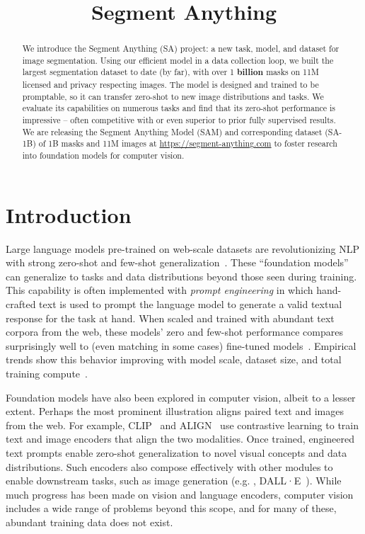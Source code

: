 \title{Segment Anything}

\begin{abstract}
We introduce the Segment Anything (SA) project: a new task, model, and dataset for image segmentation. Using our efficient model in a data collection loop, we built the largest segmentation dataset to date (by far), with over 1 \textbf{billion} masks on 11M licensed and privacy respecting images. The model is designed and trained to be promptable, so it can transfer zero-shot to new image distributions and tasks. We evaluate its capabilities on numerous tasks and find that its zero-shot performance is impressive -- often competitive with or even superior to prior fully supervised results. We are releasing the Segment Anything Model (SAM) and corresponding dataset (\mbox{SA-1B}) of 1B masks and 11M images at \href{https://segment-anything.com}{https://segment-anything.com} to foster research into foundation models for computer vision.
\end{abstract}

\section{Introduction}\label{sec:intro}

Large language models pre-trained on web-scale datasets are revolutionizing NLP with strong zero-shot and few-shot generalization~\cite{Brown2020}. These ``foundation models''~\cite{bommasani2021opportunities} can generalize to tasks and data distributions beyond those seen during training. This capability is often implemented with \emph{prompt engineering} in which hand-crafted text is used to prompt the language model to generate a valid textual response for the task at hand. When scaled and trained with abundant text corpora from the web, these models' zero and few-shot performance compares surprisingly well to (even matching in some cases) fine-tuned models~\cite{Brown2020,chowdhery2022palm}. Empirical trends show this behavior improving with model scale, dataset size, and total training compute~\cite{kaplan2020scaling,Brown2020,chowdhery2022palm,hoffmann2022training}.

Foundation models have also been explored in computer vision, albeit to a lesser extent. Perhaps the most prominent illustration aligns paired text and images from the web. For example, CLIP~\cite{Radford2021} and ALIGN~\cite{jia2021scaling} use contrastive learning to train text and image encoders that align the two modalities. Once trained, engineered text prompts enable zero-shot generalization to novel visual concepts and data distributions. Such encoders also compose effectively with other modules to enable downstream tasks, such as image generation (e.g. , DALL·E~\cite{Ramesh2021}). While much progress has been made on vision and language encoders, computer vision includes a wide range of problems beyond this scope, and for many of these, abundant training data does not exist.

